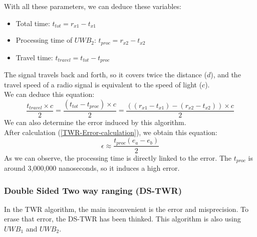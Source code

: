 With all these parameters, we can deduce these variables:
\begin{itemize}
    \item Total time: $t_{tot} = r_{x1} - t_{x1}$
    \item Processing time of $UWB_2$: $t_{proc} = r_{x2} - t_{x2}$
    \item Travel time: $t_{travel} = t_{tot} - t_{proc}$
\end{itemize}
The signal travels back and forth, so it covers twice the distance ($d$), and the travel speed of a radio signal is equivalent to the speed of light ($c$). \\ 
We can deduce this equation: 
\begin{equation} \label{TWR_eq}
\boxed{\frac{t_{travel}\times c}{2}=\frac{(t_{tot} - t_{proc}) \times c}{2}= \frac{((r_{x1} - t_{x1}) - (r_{x2} - t_{x2})) \times c}{2}}
\end{equation}
We can also determine the error induced by this algorithm.\\
After calculation (\ref{TWR-Error-calculation}), we obtain this equation: 
\begin{equation}
\epsilon \approx \frac{t_ {proc}(e_a - e_b)}{2}
\end{equation}
As we can observe, the processing time is directly linked to the error. The $t_{proc}$ is around 3,000,000 nanoseconds, so it induces a high error.

\subsubsection{Double Sided Two way ranging (DS-TWR)}
In the TWR algorithm, the main inconvenient is the error and misprecision.
To erase that error, the DS-TWR has been thinked. This algorithm is also using $UWB_1$ and $UWB_2$.

